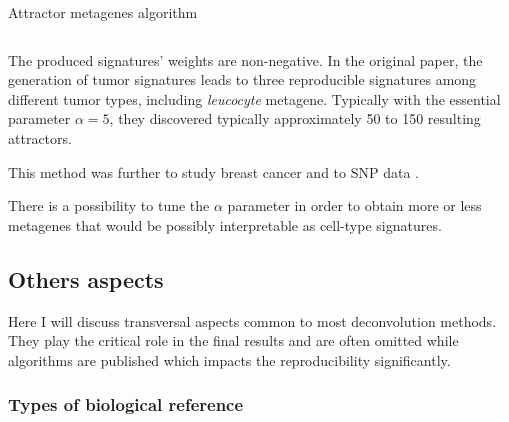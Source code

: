 \documentclass[12pt,]{book}
\theoremstyle{definition}
\theoremstyle{definition}
\theoremstyle{definition}
\theoremstyle{remark}
\begin{document}
\begin{algorithm}
\caption{Attractor metagenes algorithm}
\begin{algorithmic}[2]
\begin{equation}\label{eq:attr}\end{equation}
  
 
 
 \Repeat
{}
\end{algorithmic}
\end{algorithm}

The produced signatures' weights are non-negative. In the original
paper, the generation of tumor signatures leads to three reproducible
signatures among different tumor types, including \emph{leucocyte}
metagene. Typically with the essential parameter \(\alpha=5\), they
discovered typically approximately 50 to 150 resulting attractors.

This method was further to study breast cancer \citep{AlEjeh2014} and to
SNP data \citep{Elmas2016}.

There is a possibility to tune the \(\alpha\) parameter in order to
obtain more or less metagenes that would be possibly interpretable as
cell-type signatures.

\hypertarget{others-aspects}{%
\subsection{Others aspects}\label{others-aspects}}

Here I will discuss transversal aspects common to most deconvolution
methods. They play the critical role in the final results and are often
omitted while algorithms are published which impacts the reproducibility
significantly.

\hypertarget{types-of-biological-reference}{%
\subsubsection{Types of biological
reference}\label{types-of-biological-reference}}
\end{document}
